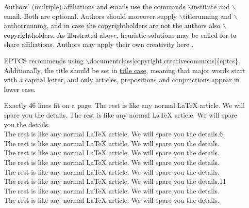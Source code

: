 \documentclass[submission,copyright,creativecommons]{eptcs}
\begin{document}
Authors' (multiple) affiliations and emails use the commands
{\ttfamily $\backslash$institute} and {\ttfamily $\backslash$email}.
Both are optional.
Authors should moreover supply
{\ttfamily $\backslash$titlerunning} and {\ttfamily $\backslash$authorrunning},
and in case the copyrightholders are not the authors also
{\ttfamily $\backslash$copyrightholders}.
As illustrated above, heuristic solutions may be called for to share
affiliations. Authors may apply their own creativity here \cite{multipleauthors}.

EPTCS recommends using {\ttfamily $\backslash$documentclass[copyright,creativecommons]\{eptcs\}}.\\
Additionally, the title should be set in \href{https://en.wikipedia.org/wiki/Title_case}{title case},
meaning that major words start with a capital letter, and only articles, prepositions and
conjunctions appear in lower case.

Exactly 46 lines fit on a page.
The rest is like any normal {\LaTeX} article.
We will spare you the details.
The rest is like any normal {\LaTeX} article.
We will spare you the details.\\
The rest is like any normal {\LaTeX} article.
We will spare you the details.\hfill6\\
The rest is like any normal {\LaTeX} article.
We will spare you the details.\\
The rest is like any normal {\LaTeX} article.
We will spare you the details.\\
The rest is like any normal {\LaTeX} article.
We will spare you the details.\\
The rest is like any normal {\LaTeX} article.
We will spare you the details.\\
The rest is like any normal {\LaTeX} article.
We will spare you the details.\hfill11\\
The rest is like any normal {\LaTeX} article.
We will spare you the details.\\
The rest is like any normal {\LaTeX} article.
We will spare you the details.
\end{document}
